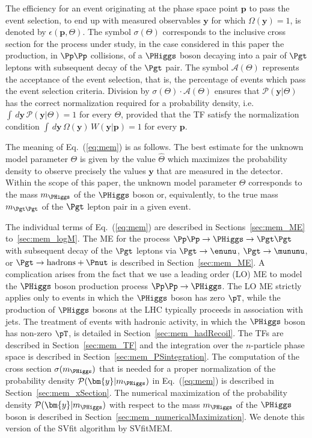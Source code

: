 The efficiency for an event originating at the phase space point
$\bm{p}$ to pass the event selection, \ie to end up with measured
observables $\bm{y}$ for which $\Omega(\bm{y}) = 1$,
is denoted by $\epsilon(\bm{p},\Theta)$. 
The symbol $\sigma(\Theta)$ corresponds to the inclusive cross section for the process under study,
in the case considered in this paper the production, in $\Pp\Pp$
collisions, of a $\PHiggs$ boson decaying into a pair of $\Pgt$ leptons
with subsequent decay of the $\Pgt$ pair.
The symbol $\mathcal{A}(\Theta)$ represents the acceptance of the
event selection, that is, the percentage of events which pass the event
selection criteria.
Division by $\sigma(\Theta) \cdot \mathcal{A}(\Theta)$ ensures that $\mathcal{P}(\bm{y}|\Theta)$ has
the correct normalization required for a probability density, 
i.e. $\int \, d\bm{y} \, \mathcal{P}(\bm{y}|\Theta) = 1$ for every $\Theta$, 
provided that the TF satisfy the normalization condition
$\int \, d\bm{y} \, \Omega(\bm{y}) \, W(\bm{y}|\bm{p}) = 1$
for every $\bm{p}$.

The meaning of Eq.~(\ref{eq:mem}) is as follows.
The best estimate for the unknown model parameter $\Theta$ is given by the
value $\hat{\Theta}$ which maximizes the probability density to observe precisely the 
values $\bm{y}$ that are measured in the detector. 
Within the scope of this paper, the unknown model parameter $\Theta$
corresponds to the mass $m_{\PHiggs}$ of the $\PHiggs$ boson or,
equivalently, to the true mass $m_{\Pgt\Pgt}$ of the $\Pgt$ lepton
pair in a given event.

The individual terms of Eq.~(\ref{eq:mem}) are described in
Sections~\ref{sec:mem_ME} to~\ref{sec:mem_logM}.
The ME for the process $\Pp\Pp \to \PHiggs \to \Pgt\Pgt$
with subsequent decay of the $\Pgt$ leptons 
via $\Pgt \to \enunu$, $\Pgt \to \mununu$, or $\Pgt \to \textrm{hadrons} + \Pnut$
is described in Section~\ref{sec:mem_ME}.
A complication arises from the fact that we use a leading order (LO)
ME to model the $\PHiggs$ boson production process $\Pp\Pp \to
\PHiggs$. The LO ME strictly applies only to events in which the $\PHiggs$ boson has zero $\pT$,
while the production of $\PHiggs$ bosons at the LHC typically
proceeds in association with jets.
The treatment of events with hadronic activity, in which the $\PHiggs$ boson has non-zero $\pT$,
is detailed in Section~\ref{sec:mem_hadRecoil}.
The TFs are described in Section~\ref{sec:mem_TF} and
the integration over the $n$-particle phase space is described in
Section~\ref{sec:mem_PSintegration}.
The computation of the cross section $\sigma(m_{\PHiggs})$ that is needed for a proper normalization of the probability density $\mathcal{P}(\bm{y}|m_{\PHiggs})$
in Eq.~(\ref{eq:mem}) is described in Section~\ref{sec:mem_xSection}.
The numerical maximization of the probability density $\mathcal{P}(\bm{y}|m_{\PHiggs})$
with respect to the mass $m_{\PHiggs}$ of the $\PHiggs$ boson is described in
Section~\ref{sec:mem_numericalMaximization}.
We denote this version of the SVfit algorithm by SVfitMEM.

